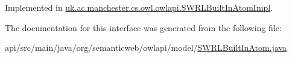 Implemented in \hyperlink{classuk_1_1ac_1_1manchester_1_1cs_1_1owl_1_1owlapi_1_1_s_w_r_l_built_in_atom_impl_afd2473f78679a7730b1e343576e9d8b9}{uk.\-ac.\-manchester.\-cs.\-owl.\-owlapi.\-S\-W\-R\-L\-Built\-In\-Atom\-Impl}.



The documentation for this interface was generated from the following file\-:\begin{DoxyCompactItemize}
\item 
api/src/main/java/org/semanticweb/owlapi/model/\hyperlink{_s_w_r_l_built_in_atom_8java}{S\-W\-R\-L\-Built\-In\-Atom.\-java}\end{DoxyCompactItemize}
